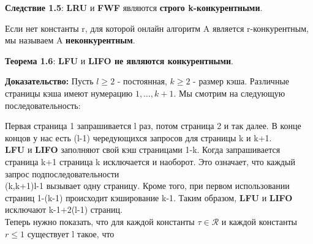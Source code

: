 \vspace{\baselineskip}


\vspace{\baselineskip}

\textbf{Следствие 1.5}: \textbf{LRU} и \textbf{FWF} являются \textbf{строго k-конкурентными}.

\vspace{\baselineskip}

Если нет константы r, для которой онлайн алгоритм A является r-конкурентным, мы называем A \textbf{неконкурентным}.

\vspace{\baselineskip}

\textbf{Теорема 1.6}: \textbf{LFU} и \textbf{LIFO не являются конкурентными}.

\vspace{\baselineskip}

\textbf{Доказательство:} Пусть $l \geq 2$ - постоянная, $k \geq 2$ - размер кэша. Различные страницы кэша имеют нумерацию $1,\dots,k+1$. Мы смотрим на следующую последовательность:

\vspace{\baselineskip}


\vspace{\baselineskip}

Первая страница 1 запрашивается l раз, потом страница 2 и так далее. В конце концов у нас есть (l-1) чередующихся запросов для страницы k и k+1.\\
\textbf{LFU} и \textbf{LIFO} заполняют свой кэш страницами 1-k. Когда запрашивается страница k+1 страница k исключается и наоборот. Это означает, что каждый запрос подпоследовательности \\ (k,k+1)l-1 вызывает одну страницу. Кроме того, при первом использовании страниц 1-(k-1) происходит кэширование k-1. Таким образом, \textbf{LFU} и \textbf{LIFO} исключают k-1+2(l-1) страниц. \\
Теперь нужно показать, что для каждой константы $\tau \in \mathcal{R}$ и каждой константы $r \leq 1$ существует l такое, что

\vspace{\baselineskip}


